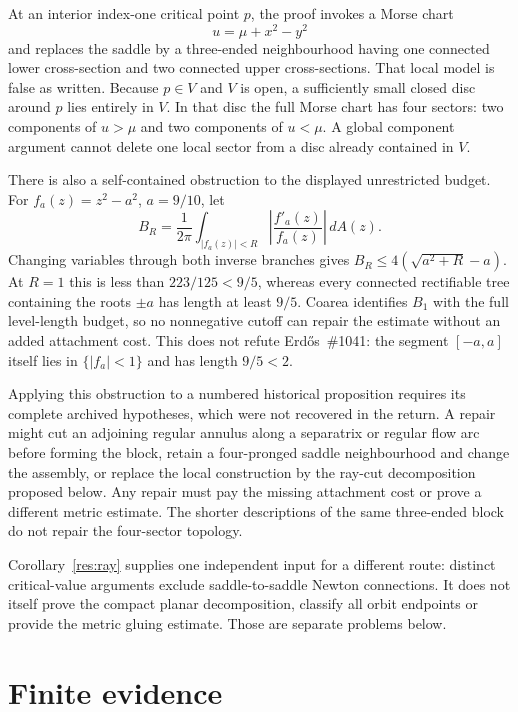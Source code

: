 \documentclass[11pt]{article}
\begin{document}
At an interior index-one critical point $p$, the proof invokes a Morse chart
\[
 u=\mu+x^2-y^2
\]
and replaces the saddle by a three-ended neighbourhood having one connected
lower cross-section and two connected upper cross-sections.  That local model
is false as written.  Because $p\in V$ and $V$ is open, a sufficiently small
closed disc around $p$ lies entirely in $V$.  In that disc the full Morse chart
has four sectors: two components of $u>\mu$ and two components of $u<\mu$.
A global component argument cannot delete one local sector from a disc already
contained in $V$.

There is also a self-contained obstruction to the displayed unrestricted
budget.  For $f_a(z)=z^2-a^2$, $a=9/10$, let
\[
 B_R=\frac1{2\pi}\int_{|f_a(z)|<R}\left|\frac{f'_a(z)}{f_a(z)}\right|\,dA(z).
\]
Changing variables through both inverse branches gives
$B_R\le4(\sqrt{a^2+R}-a)$.  At $R=1$ this is less than
$223/125<9/5$, whereas every connected rectifiable tree containing the roots
$\pm a$ has length at least $9/5$.  Coarea identifies $B_1$ with the full
level-length budget, so no nonnegative cutoff can repair the estimate without
an added attachment cost.  This does not refute Erd\H{o}s~\#1041: the segment
$[-a,a]$ itself lies in $\{|f_a|<1\}$ and has length $9/5<2$.

Applying this obstruction to a numbered historical proposition requires its
complete archived hypotheses, which were not recovered in the return.  A
repair might cut an adjoining regular annulus along a separatrix or regular
flow arc before forming the block, retain a four-pronged saddle neighbourhood
and change the assembly, or replace the local construction by the ray-cut
decomposition proposed below.  Any repair must pay the missing attachment
cost or prove a different metric estimate.
The shorter descriptions of the same three-ended block do not repair the
four-sector topology.

Corollary~\ref{res:ray} supplies one independent input for a different route:
distinct critical-value arguments exclude saddle-to-saddle Newton
connections.  It does not itself prove the compact planar decomposition,
classify all orbit endpoints or provide the metric gluing estimate.  Those are
separate problems below.

\section{Finite evidence}\label{sec:finite}
\end{document}
